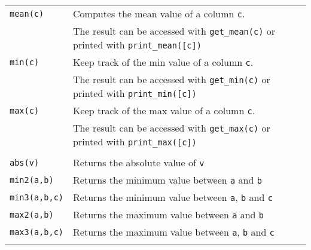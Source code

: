 \documentclass[documentation]{subfiles}
\begin{document}
\begin{longtable}{ll}
    {\tt mean(c)}     & Computes the mean value of a column {\tt c}.\\
                      & The result can be accessed with {\tt get\_mean(c)} or printed with {\tt print\_mean([c])}\\
    {\tt min(c)}      & Keep track of the min value of a column {\tt c}.\\
                      & The result can be accessed with {\tt get\_min(c)} or printed with {\tt print\_min([c])}\\
    {\tt max(c)}      & Keep track of the max value of a column {\tt c}.\\
                      & The result can be accessed with {\tt get\_max(c)} or printed with {\tt print\_max([c])}\\\\

    {\tt abs(v)}      & Returns the absolute value of {\tt v}\\
    {\tt min2(a,b)}   & Returns the minimum value between {\tt a} and {\tt b}\\
    {\tt min3(a,b,c)} & Returns the minimum value between {\tt a}, {\tt b} and {\tt c}\\
    {\tt max2(a,b)}   & Returns the maximum value between {\tt a} and {\tt b}\\
    {\tt max3(a,b,c)} & Returns the maximum value between {\tt a}, {\tt b} and {\tt c}\\\\


\end{longtable}
\end{document}
